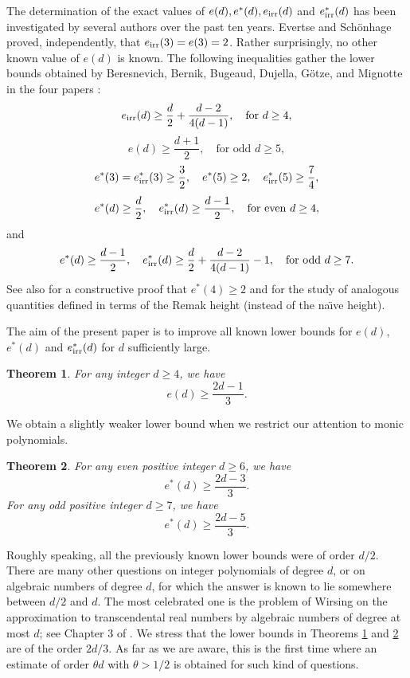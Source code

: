 \documentclass [11pt] {article}
\newtheorem{theorem}{Theorem}
\begin{document}
The determination of the exact values of $e(d), e^*(d), e_{{\rm irr}} (d)$
and $e_{{\rm irr}}^*(d)$ has been investigated by several authors over the
past ten years. Evertse \cite{Ev}
and Sch\"onhage  \cite{Sch} proved, independently, that
$e_{{\rm irr}}(3)=e(3)=2$. Rather surprisingly,
no other known value of $e(d)$ is known.
The following inequalities gather the lower bounds obtained
by Beresnevich, Bernik, Bugeaud, Dujella, G\"otze, and Mignotte in
the four papers \cite{BM1,BM2,BBG,BD}:
$$
e_{{\rm irr}}(d) \geq \frac{d}{2} +\frac{d-2}{4(d-1)}, \quad \mbox{for $d\geq 4$},
$$
$$
e (d)  \geq \frac{d+1}{2}, \quad \mbox{for odd $d\geq 5$},
$$
$$
e^*(3)=e_{{\rm irr}}^*(3) \geq \frac{3}{2}, \quad e^* (5) \ge 2,
\quad e_{{\rm irr}}^*(5) \ge \frac{7}{4},
$$
$$
e^*(d)\geq \frac{d}{2}, \quad e_{{\rm irr}}^*(d) \geq \frac{d-1}{2},
\quad \mbox{for even $d\geq 4$},
$$
and
$$
e^*(d)\geq \frac{d-1}{2}, \quad
e_{{\rm irr}}^*(d)\geq \frac{d}{2} +\frac{d-2}{4(d-1)} - 1, \quad \mbox{for odd $d\geq 7$}.
$$
See also \cite{DP} for a constructive proof that $e^*(4)\geq 2$
and \cite{Dub} for the study of analogous quantities defined in terms
of the Remak height (instead of the na\"\i ve height).



The aim of the present paper is to improve all known lower bounds for $e(d)$, $e^*(d)$ and
$e_{{\rm irr}}^* (d)$ for $d$ sufficiently large.

\begin{theorem} \label{tm1}
For any integer $d\geq 4$, we have
$$
e(d)  \geq \frac{2d-1}{3}.
$$
\end{theorem}

We obtain a slightly weaker lower bound when we restrict our
attention to monic polynomials.

\begin{theorem} \label{tm2}
For any even positive integer $d\geq 6$,  we have
$$
e^*(d) \geq \frac{2d-3}{3}.
$$
For any odd positive integer $d\geq 7$, we have
$$
e^*(d) \geq \frac{2d-5}{3}.
$$
\end{theorem}


Roughly speaking, all the previously known
lower bounds were of order $d/2$.
There are many other questions on integer polynomials of degree $d$,
or on algebraic numbers of degree $d$, for which the answer is known to lie
somewhere between $d/2$ and $d$. The most celebrated one is the problem
of Wirsing on the approximation to transcendental real numbers by algebraic
numbers of degree at most $d$; see Chapter 3 of \cite{BuLiv}.
We stress that the lower bounds in Theorems \ref{tm1} and \ref{tm2}
are of the order $2d/3$. As far as we are aware, this is the first time where
an estimate of order $\theta d$ with $\theta > 1/2$ is obtained for such kind of questions.
\end{document}
